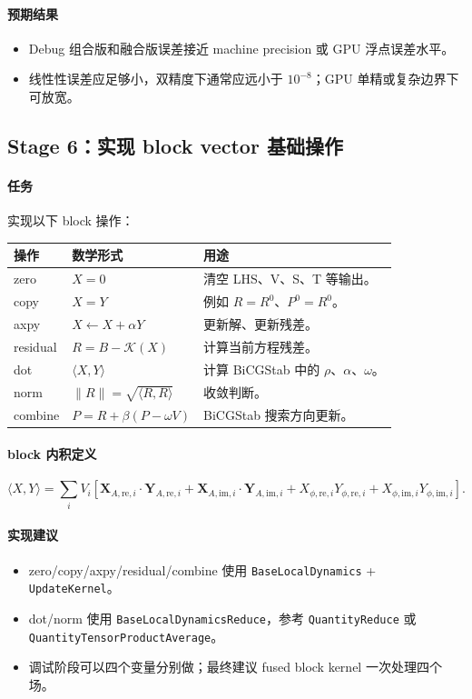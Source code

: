 \documentclass[UTF8,a4paper,11pt]{ctexart}
\newcommand{\code}[1]{\texttt{#1}}
\newcommand{\Kop}{\mathcal K}
\begin{document}
\paragraph{预期结果}
\begin{itemize}
  \item Debug 组合版和融合版误差接近 machine precision 或 GPU 浮点误差水平。
  \item 线性性误差应足够小，双精度下通常应远小于 $10^{-8}$；GPU 单精或复杂边界下可放宽。
\end{itemize}

\subsection{Stage 6：实现 block vector 基础操作}

\paragraph{任务}
实现以下 block 操作：
\begin{longtable}{p{}p{}p{}}
\toprule
操作 & 数学形式 & 用途 \\
\midrule
zero & $X=0$ & 清空 LHS、V、S、T 等输出。 \\
copy & $X=Y$ & 例如 $\hat R=R^0$、$P^0=R^0$。 \\
axpy & $X\leftarrow X+\alpha Y$ & 更新解、更新残差。 \\
residual & $R=B-\Kop(X)$ & 计算当前方程残差。 \\
dot & $\langle X,Y\rangle$ & 计算 BiCGStab 中的 $\rho$、$\alpha$、$\omega$。 \\
norm & $\|R\|=\sqrt{\langle R,R\rangle}$ & 收敛判断。 \\
combine & $P=R+\beta(P-\omega V)$ & BiCGStab 搜索方向更新。 \\
\bottomrule
\end{longtable}

\paragraph{block 内积定义}
\begin{equation}
\langle X,Y\rangle
=
\sum_i V_i\left[
\bm X_{A,\mathrm{re},i}\cdot\bm Y_{A,\mathrm{re},i}
+
\bm X_{A,\mathrm{im},i}\cdot\bm Y_{A,\mathrm{im},i}
+
X_{\phi,\mathrm{re},i}Y_{\phi,\mathrm{re},i}
+
X_{\phi,\mathrm{im},i}Y_{\phi,\mathrm{im},i}
\right].
\end{equation}

\paragraph{实现建议}
\begin{itemize}
  \item zero/copy/axpy/residual/combine 使用 \code{BaseLocalDynamics} + \code{UpdateKernel}。
  \item dot/norm 使用 \code{BaseLocalDynamicsReduce}，参考 \code{QuantityReduce} 或 \code{QuantityTensorProductAverage}。
  \item 调试阶段可以四个变量分别做；最终建议 fused block kernel 一次处理四个场。
\end{itemize}
\end{document}
